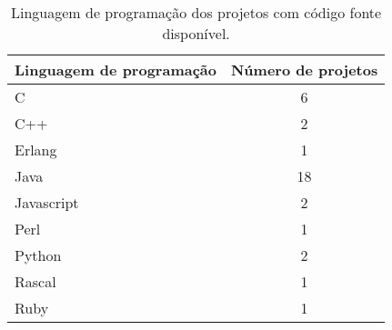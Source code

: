 

\begin{table}[h]
\caption{Linguagem de programação dos projetos com código fonte disponível.}
\centering
\begin{tabular}{| l | c |}
  \hline
  {\bf Linguagem de programação} & {\bf Número de projetos} \\
  \hline
  C & 6 \\
  C++ & 2 \\
  Erlang & 1 \\
  Java & 18 \\
  Javascript & 2 \\
  Perl & 1 \\
  Python & 2 \\
  Rascal & 1 \\
  Ruby & 1 \\
  \hline
\end{tabular}
\label{source-code-table}
\end{table}

